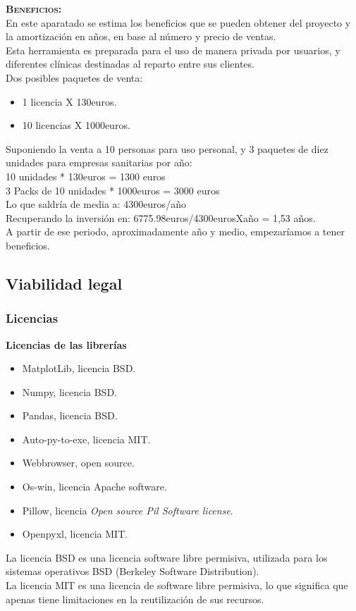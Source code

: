 \textbf{\textsc{Beneficios:}}\\
En este aparatado se estima los beneficios que se pueden obtener del proyecto y la amortización en años, en base al número y precio de ventas.\\
Esta herramienta es preparada para el uso de manera privada por usuarios, y diferentes clínicas destinadas al reparto entre sus clientes.\\
Dos posibles paquetes de venta:
\begin{itemize}
\item 1 licencia X 130euros.
\item 10 licencias X 1000euros.
\end{itemize}

Suponiendo la venta a 10 personas para uso personal, y 3 paquetes de diez unidades para empresas sanitarias por año:\\
10 unidades * 130euros = 1300 euros\\
3 Packs de 10 unidades * 1000euros = 3000 euros\\
Lo que saldría de media a: 4300euros/año\\
Recuperando la inversión en: 6775.98euros/4300eurosXaño = 1,53 años.\\
A partir de ese periodo, aproximadamente año y medio, empezaríamos a tener beneficios.

\subsection{Viabilidad legal}
\subsubsection{Licencias}
\textbf{Licencias de las librerías}\\
\begin{itemize}
\item MatplotLib, licencia BSD.
\item Numpy, licencia BSD.
\item Pandas, licencia BSD.
\item Auto-py-to-exe, licencia MIT.
\item Webbrowser, open source.
\item Os-win, licencia Apache software.
\item Pillow, licencia \textit{Open source Pil Software license}.
\item Openpyxl, licencia MIT. 
\end{itemize}
La licencia BSD es una licencia software libre permisiva, utilizada para los sistemas operativos BSD (Berkeley Software Distribution).\\
La licencia MIT es una licencia de software libre permisiva, lo que significa que apenas tiene limitaciones en la reutilización de sus recursos.\\

